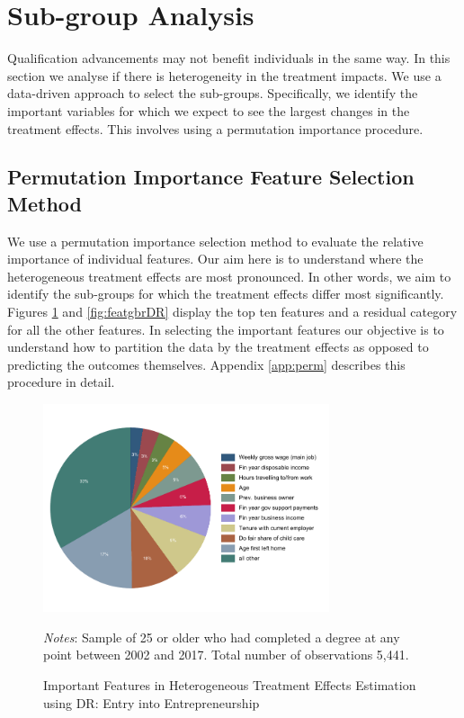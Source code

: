 \documentclass[12pt, a4paper]{article}
\begin{document}
\section{Sub-group Analysis}

Qualification advancements may not benefit individuals in the same way. In this section we analyse if there is heterogeneity in the treatment impacts. We use a data-driven approach to select the sub-groups. Specifically, we identify the important variables for which we expect to see the largest changes in the treatment effects. This involves using a permutation importance procedure.
%
%


\subsection{Permutation Importance Feature Selection Method}

We use a permutation importance selection method \citep{breiman2001,molnar2020}
to evaluate the relative importance of individual features. Our aim here is to
understand where the heterogeneous treatment effects are most pronounced. In
other words, we aim to identify the sub-groups for which the treatment effects
differ most significantly. Figures \ref{fig:featgbrDRe} and \ref{fig:featgbrDR} display the top ten features and a residual category for all the other features. In selecting the important features our objective is to understand how to partition the data by the treatment effects as opposed to predicting the outcomes themselves. Appendix \ref{app:perm} describes this procedure in detail.

\singlespacing
\begin{figure}[htbp]
\centering
\caption{Important Features in Heterogeneous Treatment Effects Estimation using DR: Entry into Entrepreneurship}
\vspace{0.5cm}
  \label{fig:featgbrDRe}
    \includegraphics[width=0.75\textwidth]{_figures/DR_influenceP_GBR_chself_100.pdf}
\parbox{1\textwidth}{\footnotesize{\textit{Notes}: Sample of 25 or older who had completed a degree at any point between 2002 and 2017. Total number of observations 5,441.}}
\end{figure}
\end{document}
